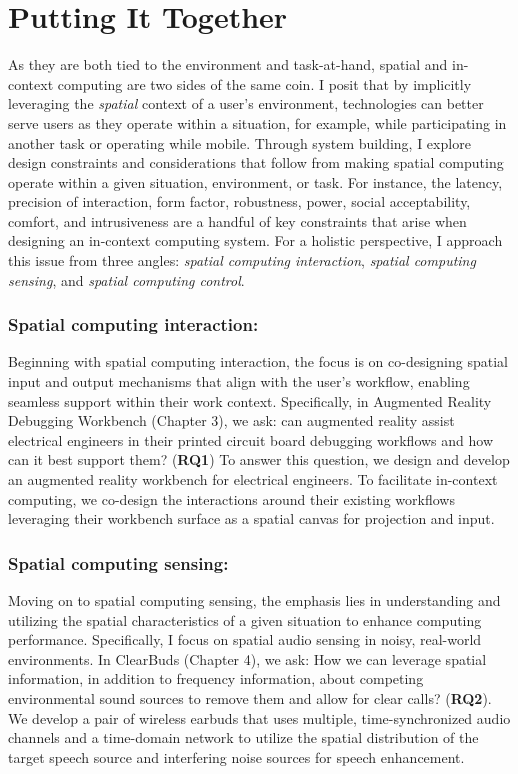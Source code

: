 \documentclass [11pt, proquest] {uwthesis}[2020/02/24]
\begin{document}
 
\section{Putting It Together}
 
As they are both tied to the environment and task-at-hand, spatial and in-context computing are two sides of the same coin. I posit that by implicitly leveraging the \textit{spatial} context of a user’s environment, technologies can better serve users as they operate within a situation, for example, while participating in another task or operating while mobile. Through system building, I explore design constraints and considerations that follow from making spatial computing operate within a given situation, environment, or task. For instance, the latency, precision of interaction, form factor, robustness, power, social acceptability, comfort, and intrusiveness are a handful of key constraints that arise when designing an in-context computing system. For a holistic perspective, I approach this issue from three angles: \textit{spatial computing interaction}, \textit{spatial computing sensing}, and \textit{spatial computing control}.

\subsubsection{Spatial computing interaction:} Beginning with spatial computing interaction, the focus is on co-designing spatial input and output mechanisms that align with the user's workflow, enabling seamless support within their work context. Specifically, in Augmented Reality Debugging Workbench (Chapter 3), we ask: can augmented reality assist electrical engineers in their printed circuit board debugging workflows and how can it best support them? (\textbf{RQ1}) To answer this question, we design and develop an augmented reality workbench for electrical engineers. To facilitate in-context computing, we co-design the interactions around their existing workflows leveraging their workbench surface as a spatial canvas for projection and input.

\subsubsection{Spatial computing sensing:} Moving on to spatial computing sensing, the emphasis lies in understanding and utilizing the spatial characteristics of a given situation to enhance computing performance. Specifically, I focus on spatial audio sensing in noisy, real-world environments. In ClearBuds (Chapter 4), we ask: How we can leverage spatial information, in addition to frequency information, about competing environmental sound sources to remove them and allow for clear calls? (\textbf{RQ2}). We develop a pair of wireless earbuds that uses multiple, time-synchronized audio channels and a time-domain network to utilize the spatial distribution of the target speech source and interfering noise sources for speech enhancement.
\end{document}
